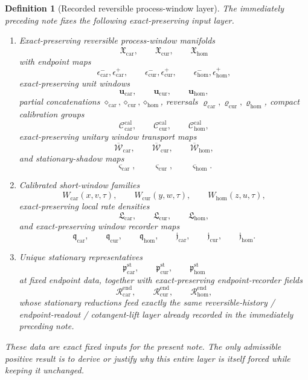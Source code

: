 \documentclass[11pt]{article}
\newcommand{\TensorWindowClass}{\mathfrak X_{\mathrm{car}}}
\newcommand{\CurWindowClass}{\mathfrak X_{\mathrm{cur}}}
\newcommand{\HomWindowClass}{\mathfrak X_{\mathrm{hom}}}
\newcommand{\TensorCalGroup}{\mathcal C_{\mathrm{car}}^{\mathrm{cal}}}
\newcommand{\CurCalGroup}{\mathcal C_{\mathrm{cur}}^{\mathrm{cal}}}
\newcommand{\HomCalGroup}{\mathcal C_{\mathrm{hom}}^{\mathrm{cal}}}
\newcommand{\TensorWindowRep}{\overline{\mathscr W}_{\mathrm{car}}}
\newcommand{\CurWindowRep}{\overline{\mathscr W}_{\mathrm{cur}}}
\newcommand{\HomWindowRep}{\overline{\mathscr W}_{\mathrm{hom}}}
\newcommand{\TensorStatTag}{\varsigma_{\mathrm{car}}}
\newcommand{\CurStatTag}{\varsigma_{\mathrm{cur}}}
\newcommand{\HomStatTag}{\varsigma_{\mathrm{hom}}}
\newcommand{\TensorLocalRate}{\mathfrak L_{\mathrm{car}}}
\newcommand{\CurLocalRate}{\mathfrak L_{\mathrm{cur}}}
\newcommand{\HomLocalRate}{\mathfrak L_{\mathrm{hom}}}
\newcommand{\TensorWindowDensity}{\mathfrak q_{\mathrm{car}}}
\newcommand{\CurWindowDensity}{\mathfrak q_{\mathrm{cur}}}
\newcommand{\HomWindowDensity}{\mathfrak q_{\mathrm{hom}}}
\newcommand{\TensorWindowFlux}{\mathfrak j_{\mathrm{car}}}
\newcommand{\CurWindowFlux}{\mathfrak j_{\mathrm{cur}}}
\newcommand{\HomWindowFlux}{\mathfrak j_{\mathrm{hom}}}
\newcommand{\TensorEndpointReadSeed}{\mathscr R_{\mathrm{car}}^{\mathrm{end}}}
\newcommand{\CurEndpointReadSeed}{\mathscr R_{\mathrm{cur}}^{\mathrm{end}}}
\newcommand{\HomEndpointReadSeed}{\mathscr R_{\mathrm{hom}}^{\mathrm{end}}}
\newcommand{\TensorStationaryWindow}{\mathfrak p_{\mathrm{car}}^{\mathrm{st}}}
\newcommand{\CurStationaryWindow}{\mathfrak p_{\mathrm{cur}}^{\mathrm{st}}}
\newcommand{\HomStationaryWindow}{\mathfrak p_{\mathrm{hom}}^{\mathrm{st}}}
\newtheorem{definition}{Definition}
\begin{document}
\begin{definition}[Recorded reversible process-window layer]
\label{def:recorded_layer}
The immediately preceding note fixes the following exact-preserving input layer.
\begin{enumerate}
    \item Exact-preserving reversible process-window manifolds
    \[
    \TensorWindowClass,\qquad
    \CurWindowClass,\qquad
    \HomWindowClass
    \]
    with endpoint maps
    \[
    \epsilon_{\mathrm{car}}^{-},\epsilon_{\mathrm{car}}^{+},\qquad
    \epsilon_{\mathrm{cur}}^{-},\epsilon_{\mathrm{cur}}^{+},\qquad
    \epsilon_{\mathrm{hom}}^{-},\epsilon_{\mathrm{hom}}^{+},
    \]
    exact-preserving unit windows
    \[
    \mathbf u_{\mathrm{car}},\qquad
    \mathbf u_{\mathrm{cur}},\qquad
    \mathbf u_{\mathrm{hom}},
    \]
    partial concatenations \(\diamond_{\mathrm{car}},\diamond_{\mathrm{cur}},\diamond_{\mathrm{hom}}\), reversals \(\varrho_{\mathrm{car}},\varrho_{\mathrm{cur}},\varrho_{\mathrm{hom}}\), compact calibration groups
    \[
    \TensorCalGroup,\qquad
    \CurCalGroup,\qquad
    \HomCalGroup,
    \]
    exact-preserving unitary window transport maps
    \[
    \TensorWindowRep,\qquad
    \CurWindowRep,\qquad
    \HomWindowRep,
    \]
    and stationary-shadow maps
    \[
    \TensorStatTag,\qquad
    \CurStatTag,\qquad
    \HomStatTag.
    \]
    \item Calibrated short-window families
    \[
    W_{\mathrm{car}}(x,v,\tau),\qquad
    W_{\mathrm{cur}}(y,w,\tau),\qquad
    W_{\mathrm{hom}}(z,u,\tau),
    \]
    exact-preserving local rate densities
    \[
    \TensorLocalRate,\qquad
    \CurLocalRate,\qquad
    \HomLocalRate,
    \]
    and exact-preserving window recorder maps
    \[
    \TensorWindowDensity,\qquad
    \CurWindowDensity,\qquad
    \HomWindowDensity,\qquad
    \TensorWindowFlux,\qquad
    \CurWindowFlux,\qquad
    \HomWindowFlux.
    \]
    \item Unique stationary representatives
    \[
    \TensorStationaryWindow,\qquad
    \CurStationaryWindow,\qquad
    \HomStationaryWindow
    \]
    at fixed endpoint data, together with exact-preserving endpoint-recorder fields
    \[
    \TensorEndpointReadSeed,\qquad
    \CurEndpointReadSeed,\qquad
    \HomEndpointReadSeed,
    \]
    whose stationary reductions feed exactly the same reversible-history / endpoint-readout / cotangent-lift layer already recorded in the immediately preceding note.
\end{enumerate}
These data are exact fixed inputs for the present note. The only admissible positive result is to derive or justify why this entire layer is itself forced while keeping it unchanged.
\end{definition}
\end{document}
